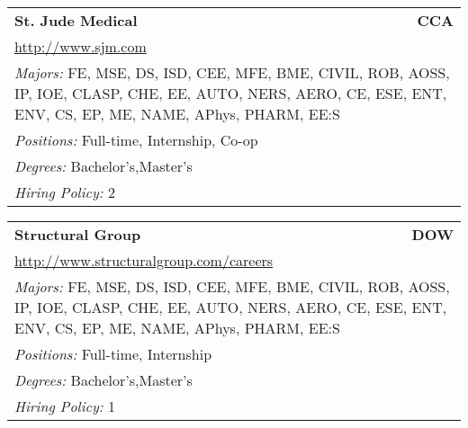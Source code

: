 \documentclass[twoside]{article}
\begin{document}
\begin{center}
\begin{multicols}{3}
\begin{FlushLeft}
\begin{minipage}{\columnwidth}
\end{minipage}
 
\begin{minipage}{\columnwidth}\begin{tabularx}{.95\columnwidth}{Xr}
                 {\Large\bf St. Jude Medical} & {\Large\bf CCA}\\
    \multicolumn{2}{p{.95\columnwidth}}{\url{http://www.sjm.com}}\\
    \multicolumn{2}{p{.95\columnwidth}}{\emph{Majors:} FE, MSE, DS, ISD, CEE, MFE, BME, CIVIL, ROB, AOSS, IP, IOE, CLASP, CHE, EE, AUTO, NERS, AERO, CE, ESE, ENT, ENV, CS, EP, ME, NAME, APhys, PHARM, EE:S}\\
    \multicolumn{2}{p{.95\columnwidth}}{\emph{Positions:} Full-time, Internship, Co-op}\\
    \multicolumn{2}{p{.95\columnwidth}}{\emph{Degrees:} Bachelor's,Master's}\\
    \multicolumn{2}{p{.95\columnwidth}}{\emph{Hiring Policy:} 2}\\
    \end{tabularx}
    
\end{minipage}
 
\begin{minipage}{\columnwidth}\begin{tabularx}{.95\columnwidth}{Xr}
                 {\Large\bf Structural Group} & {\Large\bf DOW}\\
    \multicolumn{2}{p{.95\columnwidth}}{\url{http://www.structuralgroup.com/careers}}\\
    \multicolumn{2}{p{.95\columnwidth}}{\emph{Majors:} FE, MSE, DS, ISD, CEE, MFE, BME, CIVIL, ROB, AOSS, IP, IOE, CLASP, CHE, EE, AUTO, NERS, AERO, CE, ESE, ENT, ENV, CS, EP, ME, NAME, APhys, PHARM, EE:S}\\
    \multicolumn{2}{p{.95\columnwidth}}{\emph{Positions:} Full-time, Internship}\\
    \multicolumn{2}{p{.95\columnwidth}}{\emph{Degrees:} Bachelor's,Master's}\\
    \multicolumn{2}{p{.95\columnwidth}}{\emph{Hiring Policy:} 1}\\
    \end{tabularx}
    
\end{minipage}
 

\end{FlushLeft}
\end{multicols}
\end{center}
\end{document}
